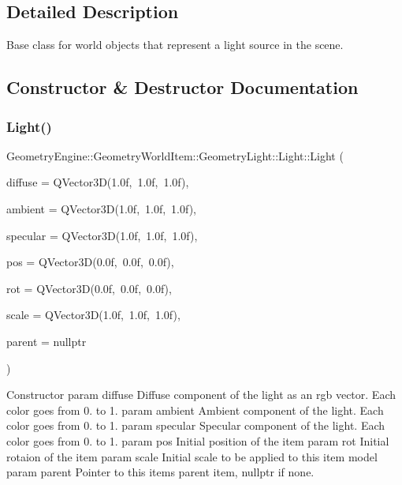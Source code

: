 \subsection{Detailed Description}
Base class for world objects that represent a light source in the scene. 

\subsection{Constructor \& Destructor Documentation}
\mbox{\label{class_geometry_engine_1_1_geometry_world_item_1_1_geometry_light_1_1_light_a9dcea4ccc13220212d25379a52dd82b2}} 
\subsubsection{\texorpdfstring{Light()}{Light()}}
{\footnotesize\ttfamily Geometry\+Engine\+::\+Geometry\+World\+Item\+::\+Geometry\+Light\+::\+Light\+::\+Light (\begin{DoxyParamCaption}\item[{const Q\+Vector3D \&}]{diffuse = {\ttfamily QVector3D(1.0f,~1.0f,~1.0f)},  }\item[{const Q\+Vector3D \&}]{ambient = {\ttfamily QVector3D(1.0f,~1.0f,~1.0f)},  }\item[{const Q\+Vector3D \&}]{specular = {\ttfamily QVector3D(1.0f,~1.0f,~1.0f)},  }\item[{const Q\+Vector3D \&}]{pos = {\ttfamily QVector3D(0.0f,~0.0f,~0.0f)},  }\item[{const Q\+Vector3D \&}]{rot = {\ttfamily QVector3D(0.0f,~0.0f,~0.0f)},  }\item[{const Q\+Vector3D \&}]{scale = {\ttfamily QVector3D(1.0f,~1.0f,~1.0f)},  }\item[{\mbox{\hyperlink{class_geometry_engine_1_1_geometry_world_item_1_1_world_item}{World\+Item}} $\ast$}]{parent = {\ttfamily nullptr} }\end{DoxyParamCaption})}

Constructor param diffuse Diffuse component of the light as an rgb vector. Each color goes from 0. to 1. param ambient Ambient component of the light. Each color goes from 0. to 1. param specular Specular component of the light. Each color goes from 0. to 1. param pos Initial position of the item param rot Initial rotaion of the item param scale Initial scale to be applied to this item model param parent Pointer to this items parent item, nullptr if none. 


